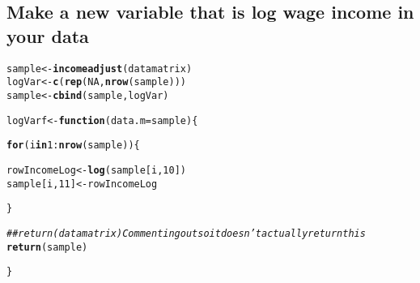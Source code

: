 \documentclass{article}\usepackage[]{graphicx}\usepackage[]{color}
\makeatletter
\newcommand{\hlnum}[1]{\textcolor[rgb]{0.686,0.059,0.569}{#1}}%
\newcommand{\hlcom}[1]{\textcolor[rgb]{0.678,0.584,0.686}{\textit{#1}}}%
\newcommand{\hlopt}[1]{\textcolor[rgb]{0,0,0}{#1}}%
\newcommand{\hlstd}[1]{\textcolor[rgb]{0.345,0.345,0.345}{#1}}%
\newcommand{\hlkwa}[1]{\textcolor[rgb]{0.161,0.373,0.58}{\textbf{#1}}}%
\newcommand{\hlkwb}[1]{\textcolor[rgb]{0.69,0.353,0.396}{#1}}%
\newcommand{\hlkwc}[1]{\textcolor[rgb]{0.333,0.667,0.333}{#1}}%
\newcommand{\hlkwd}[1]{\textcolor[rgb]{0.737,0.353,0.396}{\textbf{#1}}}%
\newenvironment{kframe}{%
 \def\at@end@of@kframe{}%
 \ifinner\ifhmode%
  \def\at@end@of@kframe{\end{minipage}}%
  \begin{minipage}{\columnwidth}%
 \fi\fi%
 \def\FrameCommand##1{\hskip\@totalleftmargin \hskip-\fboxsep
 \colorbox{shadecolor}{##1}\hskip-\fboxsep
     \hskip-\linewidth \hskip-\@totalleftmargin \hskip\columnwidth}%
 \MakeFramed {\advance\hsize-\width
   \@totalleftmargin\z@ \linewidth\hsize
   \@setminipage}}%
 {\par\unskip\endMakeFramed%
 \at@end@of@kframe}
\newenvironment{knitrout}{}{} %
\makeatother
\begin{document}
\subsection{Make a new variable that is log wage income in your data}

\begin{knitrout}
\color{fgcolor}\begin{kframe}
\begin{alltt}
\hlstd{sample} \hlkwb{<-} \hlkwd{incomeadjust}\hlstd{(datamatrix)}
\hlstd{logVar} \hlkwb{<-} \hlkwd{c}\hlstd{(}\hlkwd{rep}\hlstd{(}\hlnum{NA}\hlstd{,} \hlkwd{nrow}\hlstd{(sample)))}
\hlstd{sample} \hlkwb{<-} \hlkwd{cbind}\hlstd{(sample, logVar)}



\hlstd{logVarf} \hlkwb{<-} \hlkwa{function}\hlstd{(}\hlkwc{data.m} \hlstd{= sample)\{}

  \hlkwa{for} \hlstd{(i} \hlkwa{in} \hlnum{1}\hlopt{:}\hlkwd{nrow}\hlstd{(sample))\{}

    \hlstd{rowIncomeLog} \hlkwb{<-} \hlkwd{log}\hlstd{(sample[i,}\hlnum{10}\hlstd{])}
    \hlstd{sample[i,}\hlnum{11}\hlstd{]} \hlkwb{<-} \hlstd{rowIncomeLog}

  \hlstd{\}}

  \hlcom{## return(datamatrix) Commenting out so it doesn't actually return this}
  \hlkwd{return}\hlstd{(sample)}

\hlstd{\}}


\end{alltt}
\end{kframe}
\end{knitrout}
\end{document}
